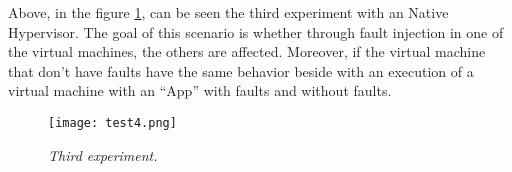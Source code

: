 Above, in the figure \ref{fig:test3}, can be seen the third experiment with an Native Hypervisor. The goal of this scenario is whether through fault injection in one of the virtual machines, the others are affected. Moreover, if the virtual machine that don't have faults have the same behavior beside with an execution of a virtual machine with an ``App'' with faults and without faults.



\begin{figure}[!ht]
\begin{center}
\texttt{[image: test4.png]}
\caption{\small \sl Third experiment.\label{fig:test3}}
\end{center}
\end{figure}

